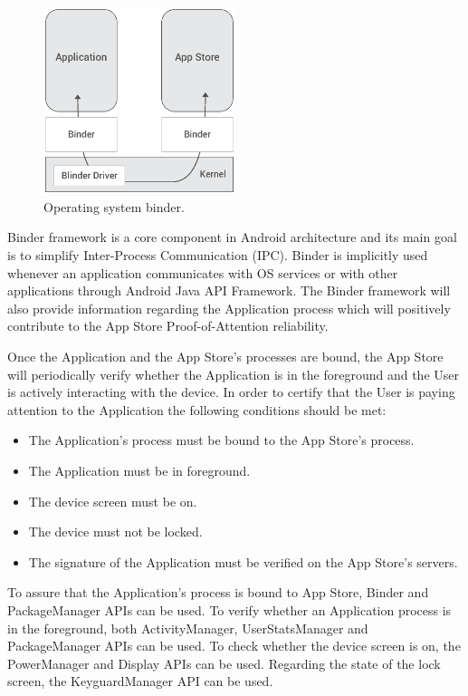 \begin{figure}[!ht]
\centering
\includegraphics[width=0.5\textwidth]{diagrams/binder_diagram.eps}
\caption{Operating system binder.}
\label{fig:binder}
\end{figure}

Binder framework is a core component in Android architecture and its main goal is to simplify Inter-Process Communication (IPC). Binder is implicitly used whenever an application communicates with OS services or with other applications through Android Java API Framework. The Binder framework will also provide information regarding the Application process which will positively contribute to the App Store Proof-of-Attention reliability.

Once the Application and the App Store's processes are bound, the App Store will periodically verify whether the Application is in the foreground and the User is actively interacting with the device. In order to certify that the User is paying attention to the Application the following conditions should be met:

\begin{itemize}
\item The Application's process must be bound to the App Store's process.
\item The Application must be in foreground.
\item The device screen must be on.
\item The device must not be locked. 
\item The signature of the Application must be verified on the App Store's servers.
\end{itemize}

To assure that the Application's process is bound to App Store, Binder and PackageManager APIs can be used. To verify whether an Application process is in the foreground, both ActivityManager, UserStatsManager and %
 PackageManager APIs can be used. To check whether the device screen is on, the PowerManager and Display APIs can be used. Regarding the state of the lock screen, the KeyguardManager API can be used. 

